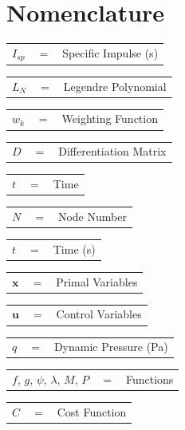 \documentclass[]{aiaa-tc}
\begin{document}
\section*{Nomenclature}
\noindent
\begin{tabular}{p{1.2cm}p{1cm}p{5cm}}
	 $I_{sp}$ & $=$ & Specific Impulse (s)\\ 
	\end{tabular} 
	\begin{tabular}{p{1.2cm}p{1cm}p{5cm}}
	  $L_N$ & $=$ & Legendre Polynomial\\ 
	  	\end{tabular} 
	  	\begin{tabular}{p{1.2cm}p{1cm}p{5cm}}
	  $w_k$& $=$& Weighting Function \\
	  	\end{tabular} 
	  	\begin{tabular}{p{1.2cm}p{1cm}p{5cm}}
	  $D$& $=$ & Differentiation Matrix \\
	  	\end{tabular} 
	  	\begin{tabular}{p{1.2cm}p{1cm}p{5cm}}
	  $t$ & $=$ & Time\\
	  	\end{tabular} 
	  	\begin{tabular}{p{1.2cm}p{1cm}p{5cm}}
	  $N$ & $=$ & Node Number \\
	  	\end{tabular} 
	  	\begin{tabular}{p{1.2cm}p{1cm}p{5cm}}
	  $t$ & $=$ & Time (s)\\
	  	\end{tabular} 
	  	\begin{tabular}{p{1.2cm}p{1cm}p{5cm}}
	  $\textbf{x}$& $=$ & Primal Variables\\
	  	\end{tabular} 
	  	\begin{tabular}{p{1.2cm}p{1cm}p{5cm}}
	  $\textbf{u}$& $=$ & Control Variables\\
	  	\end{tabular} 
	  	\begin{tabular}{p{1.2cm}p{1cm}p{5cm}}
	  $q$ & $=$ & Dynamic Pressure (Pa)\\
	  	\end{tabular} 
	  	\begin{tabular}{p{1.2cm}p{1cm}p{5cm}}
	  $f$, $g$, $\psi$, $\lambda$, $M$, $P$ & $=$ & Functions\\
	  	\end{tabular} 
	  	\begin{tabular}{p{1.2cm}p{1cm}p{5cm}}
	  $C$ & $=$ & Cost Function\\
	  	\end{tabular} 
\end{document}
